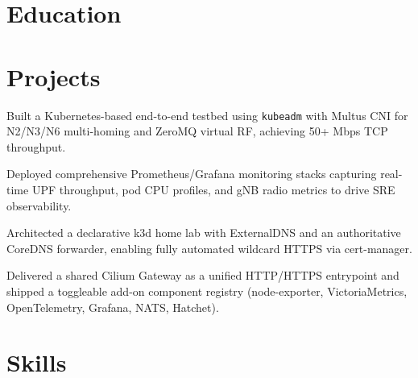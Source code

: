 \documentclass[10pt,a4paper]{resume}
\begin{document}
\section{Education}

\vspace{2pt}

\section{Projects}

\bullets
  \item Built a Kubernetes-based end-to-end testbed using \texttt{kubeadm} with Multus CNI for N2/N3/N6 multi-homing and ZeroMQ virtual RF, achieving 50+ Mbps TCP throughput.
  \item Deployed comprehensive Prometheus/Grafana monitoring stacks capturing real-time UPF throughput, pod CPU profiles, and gNB radio metrics to drive SRE observability.
\bulletsend
\vspace{1.0pt}
\bullets
  \item Architected a declarative k3d home lab with ExternalDNS and an authoritative CoreDNS forwarder, enabling fully automated wildcard HTTPS via cert-manager.
  \item Delivered a shared Cilium Gateway as a unified HTTP/HTTPS entrypoint and shipped a toggleable add-on component registry (node-exporter, VictoriaMetrics, OpenTelemetry, Grafana, NATS, Hatchet).
\bulletsend

\section{Skills}
\end{document}
